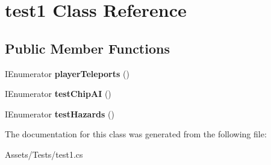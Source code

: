 \hypertarget{classtest1}{}\section{test1 Class Reference}
\label{classtest1}
\subsection*{Public Member Functions}
\begin{DoxyCompactItemize}
\item 
\mbox{\label{classtest1_a8bcdb6d65c984b9d01d9867f5ec6116c}} 
I\+Enumerator {\bfseries player\+Teleports} ()
\item 
\mbox{\label{classtest1_a7297ca0c4b2d0d44ac0c78ec5582e190}} 
I\+Enumerator {\bfseries test\+Chip\+AI} ()
\item 
\mbox{\label{classtest1_a8672271deaf79f93947d1656fcf79712}} 
I\+Enumerator {\bfseries test\+Hazards} ()
\end{DoxyCompactItemize}


The documentation for this class was generated from the following file\+:\begin{DoxyCompactItemize}
\item 
Assets/\+Tests/test1.\+cs\end{DoxyCompactItemize}
